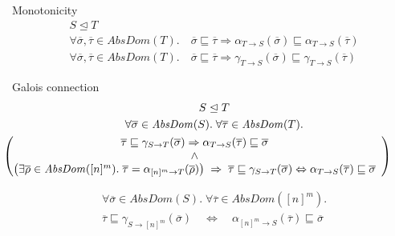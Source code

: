 \documentclass[11pt,svgnames,smaller,aspectratio=43,english]{beamer}
\renewcommand{\implies}{\Rightarrow}
\renewcommand{\iff}{\Leftrightarrow}
\begin{document}
\begin{frame}{Monotonicity}
	\begin{gather*}
		S \trianglelefteq T\\
		\forall \overline{\sigma}, \overline{\tau} \in \mathit{AbsDom}(T).\quad \overline{\sigma} \sqsubseteq \overline{\tau} \implies \alpha_{T\rightarrow S}(\overline{\sigma})\sqsubseteq\alpha_{T\rightarrow S}(\overline{\tau})\\
		\forall \overline{\sigma}, \overline{\tau} \in \mathit{AbsDom}(T).\quad \overline{\sigma} \sqsubseteq \overline{\tau} \implies \gamma_{T\rightarrow S}(\overline{\sigma})\sqsubseteq\gamma_{T\rightarrow S}(\overline{\tau})
	\end{gather*}
\end{frame}

\begin{frame}{Galois connection}
	\begin{gather*}
		S \trianglelefteq T\\
		\forall \overline{\sigma}\in \mathit{AbsDom}(S).\; \forall \overline{\tau}\in \mathit{AbsDom}(T).\\
		\hspace*{-3em}
		\left(\begin{array}{@{}cc@{}@{}}
			\overline{\tau}\sqsubseteq \gamma_{S \rightarrow T}(\overline{\sigma}) \implies \alpha_{T\rightarrow S}(\overline{\tau})\sqsubseteq \overline{\sigma} \\
			\land\\
			\left(\exists \overline{\rho}\in\mathit{AbsDom}([n]^m).\;\overline{\tau} = \alpha_{[n]^m\rightarrow T}(\overline{\rho})\right) \;\implies\; \overline{\tau}\sqsubseteq \gamma_{S\rightarrow T}(\overline{\sigma}) \iff \alpha_{T\rightarrow S}(\overline{\tau}) \sqsubseteq \overline{\sigma} 
		  \end{array}\right)
	\end{gather*}

	\begin{gather*}
		\forall \overline{\sigma}\in \mathit{AbsDom}(S).\; \forall \overline{\tau}\in \mathit{AbsDom}([n]^m).\\
		\overline{\tau} \sqsubseteq \gamma_{S\rightarrow [n]^m}(\overline{\sigma}) \quad\iff\quad \alpha_{[n]^m \rightarrow S}(\overline{\tau}) \sqsubseteq \overline{\sigma}
	\end{gather*}
\end{frame}
\end{document}
